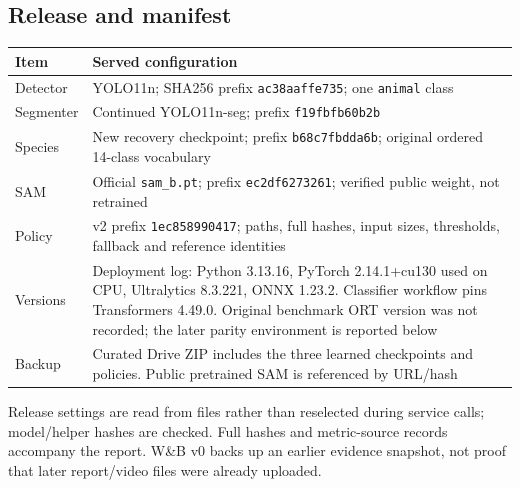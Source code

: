 \documentclass[11pt,a4paper]{article}
\begin{document}
\subsection{Release and manifest}
\par\noindent\begin{tabularx}{\linewidth}{@{}l Y@{}}\toprule
Item & Served configuration\\\midrule
Detector & YOLO11n; SHA256 prefix \texttt{ac38aaffe735}; one \texttt{animal} class\\
Segmenter & Continued YOLO11n-seg; prefix \texttt{f19fbfb60b2b}\\
Species & New recovery checkpoint; prefix \texttt{b68c7fbdda6b}; original ordered 14-class vocabulary\\
SAM & Official \texttt{sam\_b.pt}; prefix \texttt{ec2df6273261}; verified public weight, not retrained\\
Policy & v2 prefix \texttt{1ec858990417}; paths, full hashes, input sizes, thresholds, fallback and reference identities\\
Versions & Deployment log: Python 3.13.16, PyTorch 2.14.1+cu130 used on CPU, Ultralytics 8.3.221, ONNX 1.23.2. Classifier workflow pins Transformers 4.49.0. Original benchmark ORT version was not recorded; the later parity environment is reported below\\
Backup & Curated Drive ZIP includes the three learned checkpoints and policies. Public pretrained SAM is referenced by URL/hash\\\bottomrule
\end{tabularx}\par
Release settings are read from files rather than reselected during service calls; model/helper hashes are checked. Full hashes and metric-source records accompany the report. W\&B v0 backs up an earlier evidence snapshot, not proof that later report/video files were already uploaded.
\end{document}
